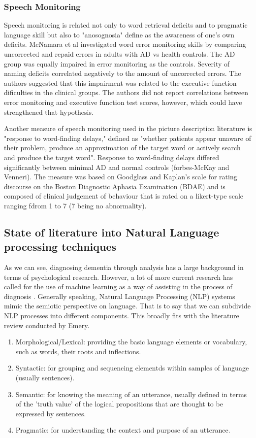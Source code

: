 \documentclass{article}
\begin{document}
\subsubsection{Speech Monitoring}
Speech monitoring is related not only to word retrieval deficits and to pragmatic language skill but also to "anosognosia" define as the awareness of one's own deficits. McNamara et al investigated word error monitoring skills by comparing uncorrected and repaid errors in adults with AD vs health controls. The AD group was equally impaired in error monitoring as the controls. Severity of naming deficits correlated negatively to the amount of uncorrected errors. The authors suggested that this impairment was related to the executive function dificulties in the clinical groups. The authors did not report correlations between error monitoring and executive function test scores, however, which could have strengthened that hypothesis. \newline
\par
Another measure of speech monitoring used in the picture description literature is "response to word-finding delays," defined as "whether patients appear unaware of their problem, produce an approximation of the target word or actively search and produce the target word". Response to word-finding delays differed significantly between minimal  AD and normal controls (forbes-McKay and Venneri). The measure was based on Goodglass and Kaplan's scale for rating discourse on the Boston Diagnostic Aphasia Examination (BDAE) and is composed of clinical judgement of behaviour that is rated on a likert-type scale ranging fdrom 1 to 7 (7 being no abnormality).






\subsection{State of literature into Natural Language processing techniques}
As we can see, diagnosing dementia through analysis has a large background in terms of psychological research. However, a lot of more current research has called for the use of machine learning as a way of assisting in the process of diagnosis \cite{Boschi2017}. Generally speaking, Natural Language Processing (NLP) systems mimic the semiotic perspective on language. That is to say that we can subdivide NLP processes into different components. This broadly fits with the literature review conducted by Emery.
\begin{enumerate}
	\item Morphological/Lexical: providing the basic language elements or vocabulary, such as words, their roots and inflections.
	\item Syntactic: for grouping and sequencing elementds within samples of language (usually sentences).
	\item Semantic: for knowing the meaning of an utterance, usually defined in terms of the 'truth value' of the logical propositions that are thought to be expressed by sentences.
	\item Pragmatic: for understanding the context and purpose of an utterance.
\end{enumerate}
\end{document}
